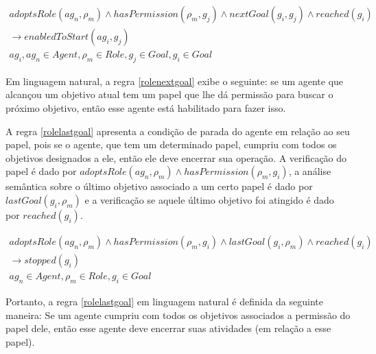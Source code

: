 \begin{eqnarray}\label{rolenextgoal}
	adoptsRole(ag_n,\rho_m) \wedge hasPermission(\rho_m,g_j) \wedge nextGoal(g_i,g_j) \wedge reached(g_i) \nonumber \\
	\to enabledToStart(ag_i,g_j) \nonumber \\
    ag_i, ag_n \in Agent, \rho_m \in Role, g_j \in Goal, g_i \in Goal
\end{eqnarray}

Em linguagem natural, a regra \ref{rolenextgoal} exibe o seguinte: se um agente que alcançou um objetivo atual tem um papel que lhe dá permissão para buscar o próximo objetivo, então esse agente está habilitado para fazer isso.

A regra \ref{rolelastgoal} apresenta a condição de parada do agente em relação ao seu papel, pois se o agente, que tem um determinado papel, cumpriu com todos os objetivos designados a ele, então ele deve encerrar sua operação. A verificação do papel é dado por $adoptsRole(ag_n,\rho_m) \wedge hasPermission(\rho_m,g_i)$, a análise semântica sobre o último objetivo associado a um certo papel é dado por $lastGoal(g_i,\rho_m)$ e a verificação se aquele último objetivo foi atingido é dado por $reached(g_i)$. 

\begin{eqnarray}\label{rolelastgoal}
	adoptsRole(ag_n,\rho_m) \wedge hasPermission(\rho_m,g_i) \wedge lastGoal(g_i,\rho_m) \wedge reached(g_i) \nonumber \\
	\to stopped(g_i) \nonumber \\
    ag_n \in Agent, \rho_m \in Role, g_i \in Goal
\end{eqnarray}

Portanto, a regra \ref{rolelastgoal} em linguagem natural é definida da seguinte maneira: Se um agente cumpriu com todos os objetivos associados a permissão do papel dele, então esse agente deve encerrar suas atividades (em relação a esse papel). 
